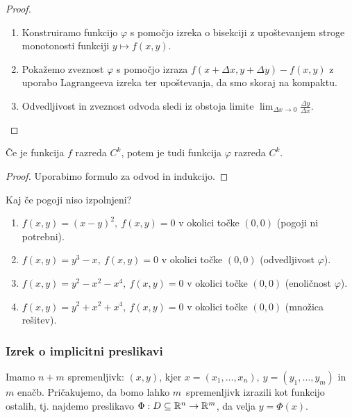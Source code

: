 \begin{proof} \
    \begin{enumerate}
        \item Konstruiramo funkcijo $\varphi$ s pomočjo izreka o bisekciji z upoštevanjem stroge monotonosti funkciji $y \mapsto f(x, y)$.
        \item Pokažemo zveznost \(\varphi\) s pomočjo izraza \(f(x + \Delta x, y + \Delta y) - f(x, y)\) z uporabo Lagrangeeva izreka ter upoštevanja, da smo skoraj na kompaktu.
        \item Odvedljivost in zveznost odvoda sledi iz obstoja limite \(\lim_{\Delta x \to 0} \frac{\Delta y}{\Delta x}\). \qedhere
    \end{enumerate}
\end{proof}

\begin{posledica}
    Če je funkcija $f$ razreda $C^k$, potem je tudi funkcija $\varphi$ razreda $C^k$.
\end{posledica}

\begin{proof}
    Uporabimo formulo za odvod in indukcijo.
\end{proof}

\begin{zgled}
    Kaj če pogoji niso izpolnjeni?
    \begin{enumerate}
        \item $f(x,y) = (x-y)^2, \ f(x,y) = 0$ v okolici točke $(0,0)$ (pogoji ni potrebni).
        \item $f(x,y) = y^3 - x, \ f(x,y) = 0$ v okolici točke $(0,0)$ (odvedljivost $\varphi$).
        \item $f(x,y) = y^2-x^2-x^4, \ f(x,y) = 0$ v okolici točke $(0,0)$ (enoličnost $\varphi$).
        \item $f(x,y) = y^2+x^2+x^4, \ f(x,y) = 0$ v okolici točke $(0,0)$ (množica rešitev).
    \end{enumerate}
\end{zgled}


\subsubsection{Izrek o implicitni preslikavi}
Imamo $n+m$ spremenljivk: $(x, y)$, kjer $x = (x_1, \ldots, x_n), \ y = (y_1, \ldots, y_m)$ in $m$ enačb. Pričakujemo, da bomo lahko $m$~spremenljivk izrazili kot funkcijo ostalih, tj. najdemo preslikavo $\Phi: D \subseteq \mathbb{R}^n \to \mathbb{R}^m$, da velja $y = \Phi(x)$.


